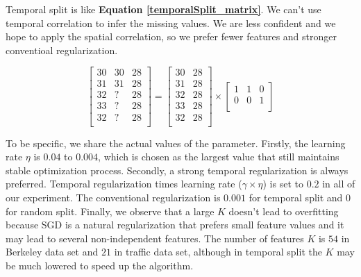 Temporal split is like \textbf{Equation \ref{temporalSplit_matrix}}.
We can't use temporal correlation to infer the missing values.
We are less confident and we hope to apply the spatial correlation, so we prefer fewer features and stronger conventioal regularization.

\begin{equation}
\label{temporalSplit_matrix}
\begin{bmatrix}
30 & 30 & 28\\
31 & 31 & 28\\
32 &  ? & 28\\
33 &  ? & 28\\
32 &  ? & 28\\
\end{bmatrix} 
= 
\begin{bmatrix}
30 & 28\\
31 & 28\\
32 & 28\\
33 & 28\\
32 & 28\\
\end{bmatrix} 
\times
\begin{bmatrix}
1 & 1 & 0\\
0 & 0 & 1\\
\end{bmatrix} 
\end{equation}

To be specific, we share the actual values of the parameter.
Firstly, the learning rate $\eta$ is $0.04$ to $0.004$, which is chosen as the largest value that still maintains stable optimization process.
Secondly, a strong temporal regularization is always preferred.
Temporal regularization times learning rate ($\gamma \times \eta$) is set to $0.2$ in all of our experiment.
The conventional regularization is $0.001$ for temporal split and $0$ for random split.
Finally, we observe that a large $K$ doesn't lead to overfitting because SGD is a natural regularization that prefers small feature values and it may lead to several non-independent features.
The number of features $K$ is $54$ in Berkeley data set and $21$ in traffic data set, although in temporal split the $K$ may be much lowered to speed up the algorithm. 


